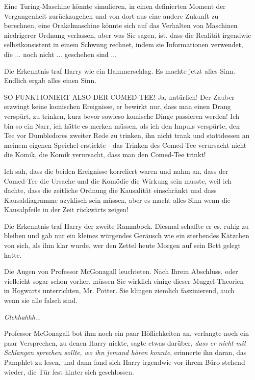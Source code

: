 Eine Turing-Maschine könnte simulieren, in einen definierten Moment der
Vergangenheit zurückzugehen und von dort aus eine andere Zukunft zu berechnen,
eine Orakelmaschine könnte sich auf das Verhalten von Maschinen niedrigerer
Ordnung verlassen, aber was Sie sagen, ist, dass die Realität irgendwie
selbstkonsistent in einem Schwung rechnet, indem sie Informationen verwendet,
die ... noch nicht ... geschehen sind ...\grqq{}

Die Erkenntnis traf Harry wie ein Hammerschlag. Es machte jetzt alles Sinn.
Endlich ergab alles einen Sinn.

\glqq{}SO FUNKTIONIERT ALSO DER COMED-TEE! Ja, natürlich! Der Zauber erzwingt
keine komischen Ereignisse, er bewirkt nur, dass man einen Drang verspürt, zu
trinken, kurz bevor sowieso komische Dinge passieren werden! Ich bin so ein
Narr, ich hätte es merken müssen, als ich den Impuls verspürte, den Tee vor
Dumbledores zweiter Rede zu trinken, ihn nicht trank und stattdessen an meinem
eigenen Speichel erstickte - das Trinken des Comed-Tee verursacht nicht die
Komik, die Komik verursacht, dass man den Comed-Tee trinkt!

Ich sah, dass die beiden Ereignisse korreliert waren und nahm an, dass der
Comed-Tee die Ursache und die Komödie die Wirkung sein musste, weil ich dachte,
dass die zeitliche Ordnung die Kausalität einschränkt und dass Kausaldiagramme
azyklisch sein müssen, aber es macht alles Sinn wenn die Kausalpfeile in der
Zeit rückwärts zeigen!\grqq{}

Die Erkenntnis traf Harry der zweite Rammbock. Diesmal schaffte er es, ruhig zu
bleiben und gab nur ein kleines würgendes Geräusch wie ein sterbendes Kätzchen
von sich, als ihm klar wurde, wer den Zettel heute Morgen auf sein Bett gelegt
hatte.

Die Augen von Professor McGonagall leuchteten. \glqq{}Nach Ihrem Abschluss, oder
vielleicht sogar schon vorher, müssen Sie wirklich einige dieser Muggel-Theorien
in Hogwarts unterrichten, Mr. Potter. Sie klingen ziemlich faszinierend, auch
wenn sie alle falsch sind.\grqq{}

\glqq{}\emph{Glehhahhh}...\grqq{}

Professor McGonagall bot ihm noch ein paar Höflichkeiten an, verlangte noch ein
paar Versprechen, zu denen Harry nickte, sagte etwas darüber, \emph{dass er
nicht mit Schlangen sprechen sollte, wo ihn jemand hören konnte}, erinnerte ihn
daran, das Pamphlet zu lesen, und dann fand sich Harry irgendwie vor ihrem Büro
stehend wieder, die Tür fest hinter sich geschlossen.

